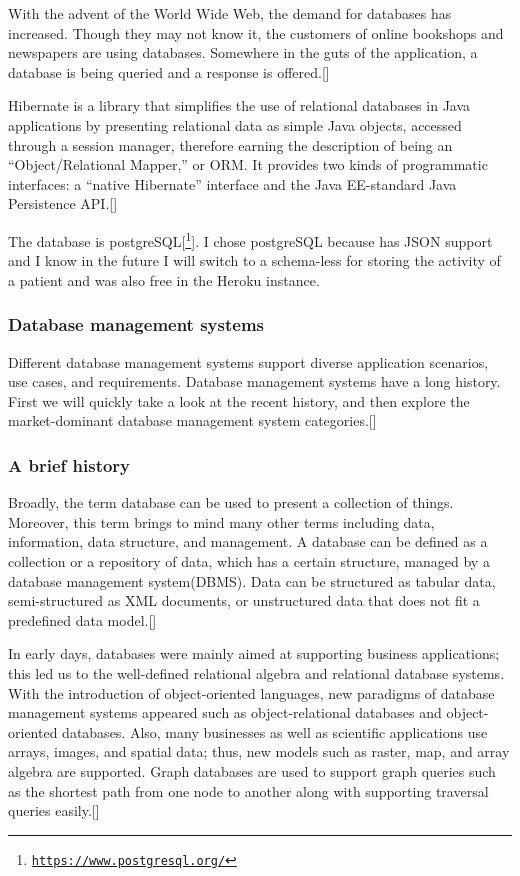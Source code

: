 With the advent of the World Wide Web, the demand for databases has increased. Though they may not know it, the customers of online bookshops and newspapers are using databases. Somewhere in the guts of the application, a database is being queried and a response is offered.[\cite{2}]
\newline

Hibernate is a library that simplifies the use of relational databases in Java applications by presenting relational data as simple Java objects, accessed through a session manager, therefore earning the description of being an “Object/Relational Mapper,” or ORM. It provides two kinds of programmatic interfaces: a “native Hibernate” interface and the Java EE-standard Java Persistence API.[\cite{2}]
\newline


The database is postgreSQL[\footnote{\href{https://www.postgresql.org/}{\texttt{https://www.postgresql.org/}}}]. I chose postgreSQL because has JSON support and I know in the future I will switch to a schema-less for storing the activity of a patient and was also free in the Heroku instance.

\subsubsection*{Database management systems}
Different database management systems support diverse application scenarios, use cases, and requirements. Database management systems have a long history. First we will quickly take a look at the recent history, and then explore the market-dominant database management system categories.[\cite{2}]
\newline

\subsubsection*{A brief history}
Broadly, the term database can be used to present a collection of things. Moreover, this term brings to mind many other terms including data, information, data structure, and management. A database can be defined as a collection or a repository of data, which has a certain structure, managed by a database management system(DBMS). Data can be structured as tabular data, semi-structured as XML documents, or unstructured data that does not fit a predefined data model.[\cite{14}]
\newline

In early days, databases were mainly aimed at supporting business applications; this led us to the well-defined relational algebra and relational database systems. With the introduction of object-oriented languages, new paradigms of database management systems appeared such as object-relational databases and object-oriented databases. Also, many businesses as well as scientific applications use arrays, images, and spatial data; thus, new models such as raster, map, and array algebra are supported. Graph databases are used to support graph queries such as the shortest path from one node to another along with supporting traversal queries easily.[\cite{14}]
\newline

